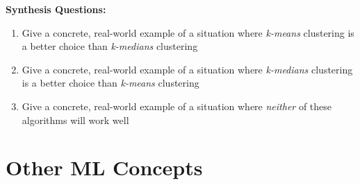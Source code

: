 \begin{questionbox}
\textbf{Synthesis Questions:}
\begin{enumerate}
    \item Give a concrete, real-world example of a situation where \textit{k-means} clustering is a better choice than \textit{k-medians} clustering
    \item Give a concrete, real-world example of a situation where \textit{k-medians} clustering is a better choice than \textit{k-means} clustering
    \item Give a concrete, real-world example of a situation where \textit{neither} of these algorithms will work well
\end{enumerate}
\end{questionbox}

\section{Other ML Concepts}

